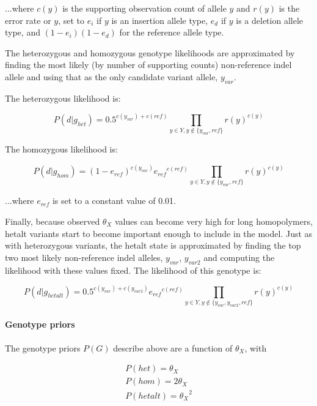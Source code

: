 \documentclass{article}
\begin{document}
...where $c(y)$ is the supporting observation count of allele $y$ and $r(y)$ is the error rate or $y$, set to $e_i$ if $y$ is an insertion allele type, $e_d$ if $y$ is a deletion allele type, and $(1-e_i) (1-e_d)$ for the reference allele type.

The heterozygous and homozygous genotype likelihoods are approximated by finding the most likely (by number of supporting counts) non-reference indel allele and using that as the only candidate variant allele, $y_{var}$.

The heterozygous likelihood is:

\begin{equation*}
P (d \vert g_{het}) = 0.5^{c(y_{var}) + c(ref)} \prod_{y \in Y, y \not\in \{y_{var},ref\}} r(y)^{c(y)}
\end{equation*}

The homozygous likelihood is:

\begin{equation*}
P (d \vert g_{hom}) = (1-e_{ref})^{c(y_{var})} {e_{ref}}^{c(ref)} \prod_{y \in Y, y \not\in \{y_{var},ref\}} r(y)^{c(y)}
\end{equation*}

...where $e_{ref}$ is set to a constant value of 0.01.

Finally, because observed $\theta_X$ values can become very high for long homopolymers, hetalt variants start to become important enough to include in the model. Just as with heterozygous variants, the hetalt state is approximated by finding the top two most likely non-reference indel alleles, $y_{var}$, $y_{var2}$ and computing the likelihood with these values fixed. The likelihood of this genotype is:

\begin{equation*}
P (d \vert g_{hetalt}) = 0.5^{c(y_{var})+c(y_{var2})} {e_{ref}}^{c(ref)} \prod_{y \in Y, y \not\in \{y_{var},y_{var2},ref\}} r(y)^{c(y)}
\end{equation*}


\paragraph{Genotype priors}

The genotype priors $P(G)$ describe above are a function of $\theta_X$, with

\begin{eqnarray*}
P(het) = \theta_X \\
P(hom) = 2\theta_X \\
P(hetalt) = {\theta_{X}}^2
\end{eqnarray*}
\end{document}
